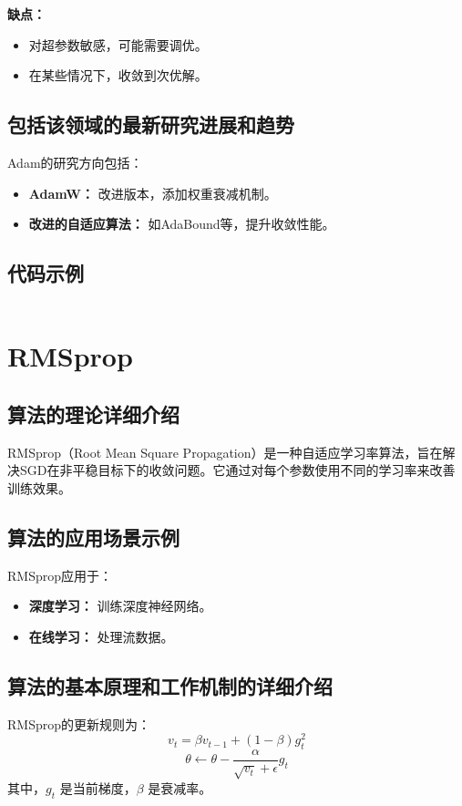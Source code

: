 \textbf{缺点：}
\begin{itemize}
    \item 对超参数敏感，可能需要调优。
    \item 在某些情况下，收敛到次优解。
\end{itemize}

\subsection*{包括该领域的最新研究进展和趋势}
Adam的研究方向包括：
\begin{itemize}
    \item \textbf{AdamW：} 改进版本，添加权重衰减机制。
    \item \textbf{改进的自适应算法：} 如AdaBound等，提升收敛性能。
\end{itemize}
\subsection*{代码示例}
\begin{lstlisting}

\end{lstlisting}


\section{RMSprop}
\subsection*{算法的理论详细介绍}
RMSprop（Root Mean Square Propagation）是一种自适应学习率算法，旨在解决SGD在非平稳目标下的收敛问题。它通过对每个参数使用不同的学习率来改善训练效果。

\subsection*{算法的应用场景示例}
RMSprop应用于：
\begin{itemize}
    \item \textbf{深度学习：} 训练深度神经网络。
    \item \textbf{在线学习：} 处理流数据。
\end{itemize}

\subsection*{算法的基本原理和工作机制的详细介绍}
RMSprop的更新规则为：
\[
    v_t = \beta v_{t-1} + (1 - \beta) g_t^2
\]
\[
    \theta \leftarrow \theta - \frac{\alpha}{\sqrt{v_t} + \epsilon} g_t
\]
其中，\(g_t\) 是当前梯度，\(\beta\) 是衰减率。

